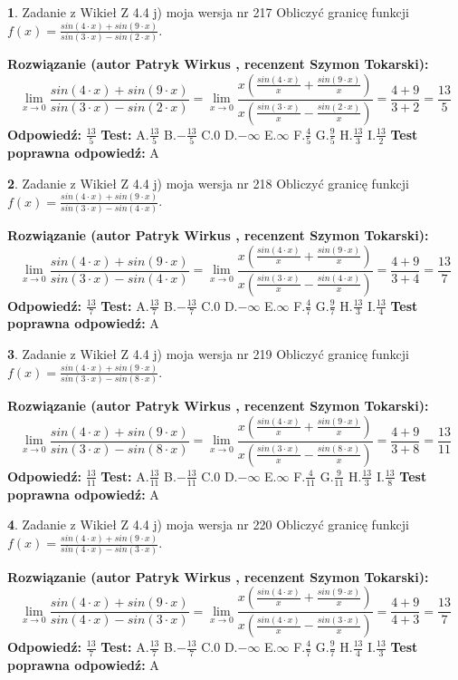 \documentclass[12pt, a4paper]{article}
\theoremstyle{definition} %
\newtheorem{zad}{}
\newcommand{\zadStart}[1]{\begin{zad}#1\newline}
\newcommand{\zadStop}{\end{zad}}
\newcommand{\rozwStart}[2]{\noindent \textbf{Rozwiązanie (autor #1 , recenzent #2): }\newline}
\newcommand{\rozwStop}{\newline}
\newcommand{\odpStart}{\noindent \textbf{Odpowiedź:}\newline}
\newcommand{\odpStop}{\newline}
\newcommand{\testStart}{\noindent \textbf{Test:}\newline}
\newcommand{\testStop}{\newline}
\newcommand{\kluczStart}{\noindent \textbf{Test poprawna odpowiedź:}\newline}
\newcommand{\kluczStop}{\newline}
\begin{document}
\zadStart{Zadanie z Wikieł Z 4.4 j) moja wersja nr 217}
Obliczyć granicę funkcji $f(x)=\frac{sin(4\cdot x) +sin(9\cdot x)}{sin(3\cdot x) -sin(2\cdot x)}$.
\zadStop
\rozwStart{Patryk Wirkus}{Szymon Tokarski}
$$\lim\limits_{x\to 0}\frac{sin(4\cdot x) +sin(9\cdot x)}{sin(3\cdot x) -sin(2\cdot x)}=\lim\limits_{x\to 0}\frac{x(\frac{sin(4\cdot x)}{x}+\frac{sin(9\cdot x)}{x})}{x(\frac{sin(3\cdot x)}{x}-\frac{sin(2\cdot x)}{x})}=\frac{4+9}{3+2} = \frac{13}{5}$$
\rozwStop
\odpStart
$\frac{13}{5}$
\odpStop
\testStart
A.$\frac{13}{5}$
B.$-\frac{13}{5}$
C.$0$
D.$-\infty$
E.$\infty$
F.$\frac{4}{5}$
G.$\frac{9}{5}$
H.$\frac{13}{3}$
I.$\frac{13}{2}$
\testStop
\kluczStart
A
\kluczStop



\zadStart{Zadanie z Wikieł Z 4.4 j) moja wersja nr 218}
Obliczyć granicę funkcji $f(x)=\frac{sin(4\cdot x) +sin(9\cdot x)}{sin(3\cdot x) -sin(4\cdot x)}$.
\zadStop
\rozwStart{Patryk Wirkus}{Szymon Tokarski}
$$\lim\limits_{x\to 0}\frac{sin(4\cdot x) +sin(9\cdot x)}{sin(3\cdot x) -sin(4\cdot x)}=\lim\limits_{x\to 0}\frac{x(\frac{sin(4\cdot x)}{x}+\frac{sin(9\cdot x)}{x})}{x(\frac{sin(3\cdot x)}{x}-\frac{sin(4\cdot x)}{x})}=\frac{4+9}{3+4} = \frac{13}{7}$$
\rozwStop
\odpStart
$\frac{13}{7}$
\odpStop
\testStart
A.$\frac{13}{7}$
B.$-\frac{13}{7}$
C.$0$
D.$-\infty$
E.$\infty$
F.$\frac{4}{7}$
G.$\frac{9}{7}$
H.$\frac{13}{3}$
I.$\frac{13}{4}$
\testStop
\kluczStart
A
\kluczStop



\zadStart{Zadanie z Wikieł Z 4.4 j) moja wersja nr 219}
Obliczyć granicę funkcji $f(x)=\frac{sin(4\cdot x) +sin(9\cdot x)}{sin(3\cdot x) -sin(8\cdot x)}$.
\zadStop
\rozwStart{Patryk Wirkus}{Szymon Tokarski}
$$\lim\limits_{x\to 0}\frac{sin(4\cdot x) +sin(9\cdot x)}{sin(3\cdot x) -sin(8\cdot x)}=\lim\limits_{x\to 0}\frac{x(\frac{sin(4\cdot x)}{x}+\frac{sin(9\cdot x)}{x})}{x(\frac{sin(3\cdot x)}{x}-\frac{sin(8\cdot x)}{x})}=\frac{4+9}{3+8} = \frac{13}{11}$$
\rozwStop
\odpStart
$\frac{13}{11}$
\odpStop
\testStart
A.$\frac{13}{11}$
B.$-\frac{13}{11}$
C.$0$
D.$-\infty$
E.$\infty$
F.$\frac{4}{11}$
G.$\frac{9}{11}$
H.$\frac{13}{3}$
I.$\frac{13}{8}$
\testStop
\kluczStart
A
\kluczStop



\zadStart{Zadanie z Wikieł Z 4.4 j) moja wersja nr 220}
Obliczyć granicę funkcji $f(x)=\frac{sin(4\cdot x) +sin(9\cdot x)}{sin(4\cdot x) -sin(3\cdot x)}$.
\zadStop
\rozwStart{Patryk Wirkus}{Szymon Tokarski}
$$\lim\limits_{x\to 0}\frac{sin(4\cdot x) +sin(9\cdot x)}{sin(4\cdot x) -sin(3\cdot x)}=\lim\limits_{x\to 0}\frac{x(\frac{sin(4\cdot x)}{x}+\frac{sin(9\cdot x)}{x})}{x(\frac{sin(4\cdot x)}{x}-\frac{sin(3\cdot x)}{x})}=\frac{4+9}{4+3} = \frac{13}{7}$$
\rozwStop
\odpStart
$\frac{13}{7}$
\odpStop
\testStart
A.$\frac{13}{7}$
B.$-\frac{13}{7}$
C.$0$
D.$-\infty$
E.$\infty$
F.$\frac{4}{7}$
G.$\frac{9}{7}$
H.$\frac{13}{4}$
I.$\frac{13}{3}$
\testStop
\kluczStart
A
\kluczStop
\end{document}
